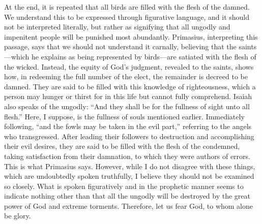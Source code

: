 At the end, it is repeated that all birds are filled with the flesh of the damned. We understand this to be expressed through figurative language, and it should not be interpreted literally, but rather as signifying that all ungodly and impenitent people will be punished most abundantly. Primasius, interpreting this passage, says that we should not understand it carnally, believing that the saints—which he explains as being represented by birds—are satiated with the flesh of the wicked. Instead, the equity of God’s judgment, revealed to the saints, shows how, in redeeming the full number of the elect, the remainder is decreed to be damned. They are said to be filled with this knowledge of righteousness, which a person may hunger or thirst for in this life but cannot fully comprehend. Isaiah also speaks of the ungodly: “And they shall be for the fullness of sight unto all flesh.” Here, I suppose, is the fullness of souls mentioned earlier. Immediately following, “and the fowls may be taken in the evil part,” referring to the angels who transgressed. After leading their followers to destruction and accomplishing their evil desires, they are said to be filled with the flesh of the condemned, taking satisfaction from their damnation, to which they were authors of errors. This is what Primasius says. However, while I do not disagree with these things, which are undoubtedly spoken truthfully, I believe they should not be examined so closely. What is spoken figuratively and in the prophetic manner seems to indicate nothing other than that all the ungodly will be destroyed by the great power of God and extreme torments. Therefore, let us fear God, to whom alone be glory.
